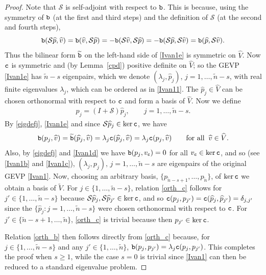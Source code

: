 \documentclass[numbers,webpdf,imaiai]{ima-authoring-template}%
\theoremstyle{thmstyletwo}%
\numberwithin{equation}{section}
\newcommand{\scS}{\mathcal{S}}
\newcommand{\txtb}{\textup{\texttt{b}}}
\newcommand{\txtc}{\textup{\texttt{c}}}
\newcommand{\wV}{\widetilde{V}}
\newcommand{\whV}{\widehat{V}}
\newcommand{\whv}{\widehat{v}}
\newcommand{\whp}{\widehat{p}}
\numberwithin{equation}{section}
\begin{document}
{\begin{proof}
Note that $\scS$ is self-adjoint with respect to $\txtb$. This is because, using the symmetry of $\txtb$ (at the first and third steps) 
and the definition of $\scS$ (at the second and fourth steps),  
\[
	\txtb(\scS \whp, \whv) = \txtb(\whv, \scS \whp) = -\txtb(\scS \whv, \scS \whp) 
	= -\txtb( \scS \whp,\scS \whv) =  \txtb(\whp, \scS \whv).
\] 
Thus the bilinear form $\widetilde{\txtb}$ on the left-hand side of \eqref{Ivan1e} is symmetric on $\whV$.
Now $\txtc$ is symmetric and (by Lemma~\ref{cpd}) positive definite on $\whV$;
so the GEVP \eqref{Ivan1e} has $\tilde n-s$ eigenpairs,
which we denote  $(\lambda_j, \whp_{j})$, $j = 1, \ldots , \tilde n-s$, with real finite eigenvalues $\lambda_j$,
which can be ordered as in \eqref{Ivan11}.  The $\whp_{j} \in \whV$ can be chosen orthonormal with respect to $\txtc$ 
and form a basis of $\whV$.  
Now we define 
\begin{align} \label{eigdefj} 
	p_j = (I + \scS)\whp_{j}, \qquad j = 1, \ldots, \tilde n-s.
\end{align} 
By \eqref{eigdefj}, \eqref{Ivan1e} and since $\scS \whp_{j} \in \ker \txtc$, we have 
\[
	\txtb(p_j, \whv) = {\widetilde{\txtb}(\whp_{j},\whv)}
	= \lambda_j \txtc(\whp_{j}, \whv) = \lambda_j \txtc(p_{j}, \whv)
	\qquad \text{for all} \;\; \whv \in \whV.
\]
Also, by \eqref{eigdefj} and \eqref{Ivan1d} we have $\txtb(p_j, v_{\txtc}) = 0$ for all $v_{\txtc} \in \ker \txtc$, and so
(see \eqref{Ivan1b} and  \eqref{Ivan1c}), 
$(\lambda_j, p_j),\,  j = 1, \ldots ,\tilde n-s$
are eigenpairs of the original GEVP \eqref{Ivan1}.
Now, choosing an arbitrary basis, $\{p_{\tilde n-s+1},\ldots,p_{\tilde n}\}$, of {$\ker\txtc$} we obtain a basis of $\wV$. 
For $j \in \{1, \ldots , \tilde n-s\}$, relation \eqref{orth_c} follows for $ j' \in \{ 1, \ldots, \tilde n-s\}$ 
because  $\scS \whp_{j}, \scS \whp_{j'} \in \ker \txtc$, and so $\txtc(p_j,p_{j'}) = \txtc(\whp_{j},\whp_{j'}) = \delta_{j,j'}$ 
since the $\{\whp_{j}: j = 1, \ldots, \tilde n-s\}$ were chosen orthonormal with respect to $\txtc$.   
For $j' \in  \{\tilde n-s+1, \ldots, \tilde n\}$,  \eqref{orth_c} is trivial because then $p_{j'} \in \ker \txtc$.

Relation \eqref{orth_b} then follows directly  from \eqref{orth_c} because,  for $j \in \{1, \ldots, \tilde n-s\}$ 
and any $j' {\in \{1,\dots,\tilde n\}}$, $\txtb(p_j, p_{j'}) = \lambda_j\txtc(p_j, p_{j'})$. 
This completes the proof when $s\ge1$, while the case $s = 0$ is trivial since \eqref{Ivan1} can then be reduced to a standard eigenvalue problem.     
\end{proof}

}
\end{document}
